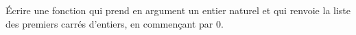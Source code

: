 \'Ecrire une fonction  qui prend en argument un entier naturel  et qui renvoie la liste des  premiers carrés d'entiers, en commençant par $0$.
